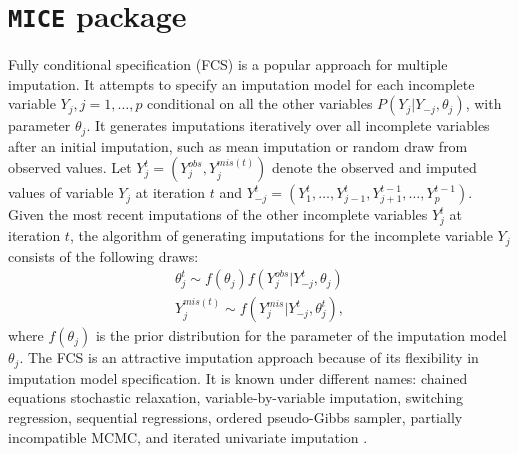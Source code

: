\documentclass[12pt, fullpage, a4paper]{article}
\begin{document}
\section{\texttt{MICE} package}
Fully conditional specification (FCS) is a popular approach for multiple imputation. It attempts to specify an imputation model for each incomplete variable $Y_j, j = 1, \dots, p$ conditional on all the other variables $P(Y_j | Y_{-j}, \theta_{j})$, with parameter $\theta_{j}$. It generates imputations iteratively over all incomplete variables after an initial imputation, such as mean imputation or random draw from observed values. Let $Y_{j}^{t} = (Y_{j}^{obs}, Y_{j}^{mis(t)})$ denote the observed and imputed values of variable $Y_{j}$ at iteration $t$ and $Y_{-j}^{t} = (Y_{1}^{t}, \dots, Y_{j-1}^{t}, Y_{j+1}^{t-1}, \dots, Y_{p}^{t-1})$. Given the most recent imputations of the other incomplete variables $Y_{j}^{t}$ at iteration $t$, the algorithm of generating imputations for the incomplete variable $Y_{j}$ consists of the following draws:
\begin{align*}
	\theta_{j}^{t} \sim f(\theta_{j})f(Y_{j}^{obs}|Y_{-j}^{t}, \theta_{j})\\
	Y_{j}^{mis(t)} \sim f(Y_{j}^{mis}|Y_{-j}^{t}, \theta_{j}^{t}),
\end{align*}
where $f(\theta_{j})$ is the prior distribution for the parameter of the imputation model $\theta_{j}$.
The FCS is an attractive imputation approach because of its flexibility in imputation model specification. It is known under different names: chained equations stochastic relaxation, variable-by-variable imputation, switching regression, sequential regressions, ordered pseudo-Gibbs sampler, partially incompatible MCMC, and iterated univariate imputation \cite{van2007multiple}. 
\end{document}
